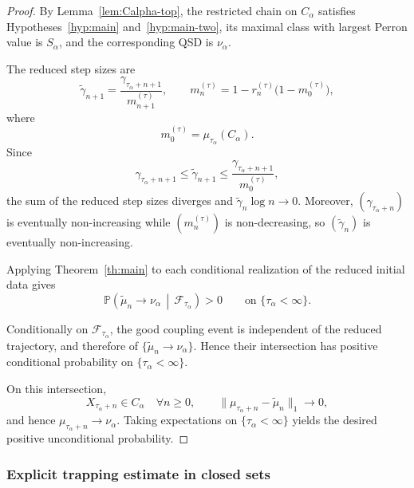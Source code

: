 \documentclass[10pt,letterpaper]{article}
\theoremstyle{compactplain}
\theoremstyle{compactdefinition}
\DeclareMathOperator{\supp}{supp}
\newcommand{\1}{\mathds{1}}
\begin{document}
\begin{proof}

By Lemma~\ref{lem:Calpha-top}, the restricted chain on \(C_\alpha\) satisfies
Hypotheses~\ref{hyp:main} and~\ref{hyp:main-two}, its maximal class with largest
Perron value is \(S_\alpha\), and the corresponding QSD is \(\nu_\alpha\).

The reduced step sizes are
\[
\widetilde\gamma_{n+1}
=
\frac{\gamma_{\tau_\alpha+n+1}}{m_{n+1}^{(\tau)}},
\qquad
m_n^{(\tau)}
=
1-r_n^{(\tau)}
\bigl(1-m_0^{(\tau)}\bigr),
\]
where
\[
m_0^{(\tau)}
=
\mu_{\tau_\alpha}(C_\alpha).
\]
Since
\[
\gamma_{\tau_\alpha+n+1}
\leq
\widetilde\gamma_{n+1}
\leq
\frac{\gamma_{\tau_\alpha+n+1}}{m_0^{(\tau)}},
\]
the sum of the reduced step sizes diverges and
\(\widetilde\gamma_n\log n\to0\). Moreover,
\((\gamma_{\tau_\alpha+n})\) is eventually non-increasing while
\((m_n^{(\tau)})\) is non-decreasing, so
\((\widetilde\gamma_n)\) is eventually non-increasing.

Applying Theorem~\ref{th:main} to each conditional realization of the reduced
initial data gives
\[
\mathbb P\left(
\widetilde\mu_n\to\nu_\alpha
\,\middle|\,
\mathcal F_{\tau_\alpha}
\right)>0
\qquad
\text{on }\{\tau_\alpha<\infty\}.
\]

Conditionally on \(\mathcal F_{\tau_\alpha}\), the good coupling event is
independent of the reduced trajectory, and therefore of
\(\{\widetilde\mu_n\to\nu_\alpha\}\). Hence their intersection has positive
conditional probability on \(\{\tau_\alpha<\infty\}\).


On this intersection,
\[
X_{\tau_\alpha+n}\in C_\alpha
\quad\forall n\geq0,
\qquad
\|\mu_{\tau_\alpha+n}-\widetilde\mu_n\|_1\to0,
\]
and hence \(\mu_{\tau_\alpha+n}\to\nu_\alpha\). Taking expectations on \(\{\tau_\alpha<\infty\}\) yields the desired positive unconditional probability.


\end{proof}



\subsubsection{Explicit trapping estimate in closed sets}
\end{document}
